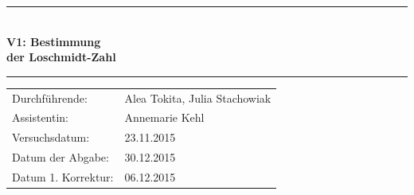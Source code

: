 \documentclass[12pt,a4paper,titlepage,headinclude,bibtotoc]{scrartcl}
\begin{document}
\begin{titlepage}
\centering

\vspace*{1cm}

\rule{\textwidth}{1pt}\\[0.5cm]
{\huge \bfseries
  V1: Bestimmung\\[1.5ex]
  der Loschmidt-Zahl}\\[0.5cm]
\rule{\textwidth}{1pt}

\vspace*{2cm}


\begin{Large}
\begin{tabular}{ll}
Durchführende: &  Alea Tokita, Julia Stachowiak\\
Assistentin: & Annemarie Kehl\\
 Versuchsdatum: & 23.11.2015\\
 Datum der Abgabe: & 30.12.2015\\
 Datum 1. Korrektur: & 06.12.2015\\
\end{tabular}
\end{Large}

\vspace*{1cm}

\begin{Large}
\end{Large}

\end{titlepage}
\end{document}
